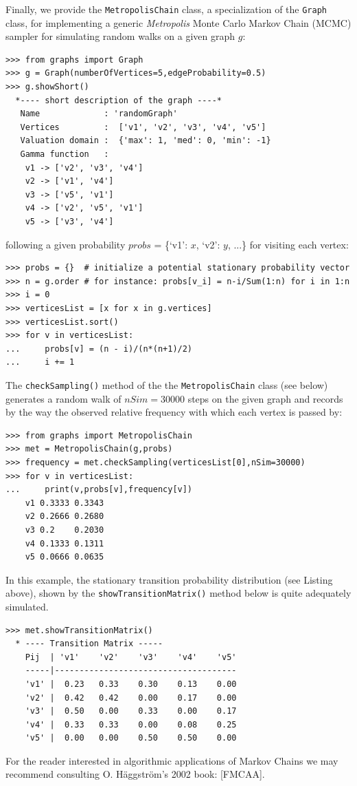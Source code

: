 Finally, we provide the \texttt{MetropolisChain} class, a specialization of the \texttt{Graph} class, for implementing a generic \emph{Metropolis} Monte Carlo Markov Chain (MCMC) sampler for simulating random walks on a given graph $g$:
\begin{lstlisting}
>>> from graphs import Graph
>>> g = Graph(numberOfVertices=5,edgeProbability=0.5)
>>> g.showShort()
  *---- short description of the graph ----*
   Name             : 'randomGraph'
   Vertices         :  ['v1', 'v2', 'v3', 'v4', 'v5']
   Valuation domain :  {'max': 1, 'med': 0, 'min': -1}
   Gamma function   :
    v1 -> ['v2', 'v3', 'v4']
    v2 -> ['v1', 'v4']
    v3 -> ['v5', 'v1']
    v4 -> ['v2', 'v5', 'v1']
    v5 -> ['v3', 'v4']
\end{lstlisting}
following a given probability $probs$ = \{‘v1’: $x$, ‘v2’: $y$, ...\} for visiting each vertex:
\begin{lstlisting}
>>> probs = {}  # initialize a potential stationary probability vector 
>>> n = g.order # for instance: probs[v_i] = n-i/Sum(1:n) for i in 1:n
>>> i = 0
>>> verticesList = [x for x in g.vertices]
>>> verticesList.sort()
>>> for v in verticesList:
...     probs[v] = (n - i)/(n*(n+1)/2)
...     i += 1
\end{lstlisting}

The \texttt{checkSampling()} method of the the \texttt{MetropolisChain} class (see below) generates a random walk of $nSim = 30000$ steps on the given graph and records by the way the observed relative frequency with which each vertex is passed by:
\begin{lstlisting}
>>> from graphs import MetropolisChain     
>>> met = MetropolisChain(g,probs)
>>> frequency = met.checkSampling(verticesList[0],nSim=30000)
>>> for v in verticesList:
...     print(v,probs[v],frequency[v])   
    v1 0.3333 0.3343
    v2 0.2666 0.2680
    v3 0.2    0.2030
    v4 0.1333 0.1311
    v5 0.0666 0.0635
\end{lstlisting}
  In this example, the stationary transition probability distribution (see Listing above), shown by the \texttt{showTransitionMatrix()} method below is quite adequately simulated.
\begin{lstlisting}
>>> met.showTransitionMatrix()
  * ---- Transition Matrix -----
    Pij  | 'v1'    'v2'    'v3'    'v4'    'v5'
    -----|-------------------------------------
    'v1' |  0.23   0.33    0.30    0.13    0.00
    'v2' |  0.42   0.42    0.00    0.17    0.00
    'v3' |  0.50   0.00    0.33    0.00    0.17
    'v4' |  0.33   0.33    0.00    0.08    0.25
    'v5' |  0.00   0.00    0.50    0.50    0.00
\end{lstlisting}

For the reader interested in algorithmic applications of Markov Chains we may recommend consulting O. Häggström's 2002 book: [FMCAA].
 
